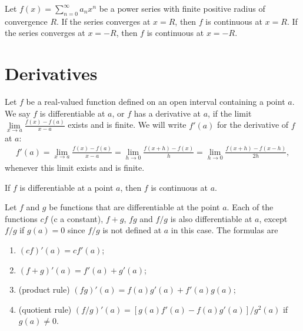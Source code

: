 \begin{theo}{1}
	Let $f(x) = \sum_{n=0}^{\infty} a_n x^n$ be a power series with finite positive radius of convergence $R$. If the series converges at $x = R$, then $f$ is continuous at $x = R$. If the series converges at $x = −R$, then $f$ is continuous	at $x = −R$.
\end{theo}

\newpage

\section{Derivatives}

\begin{defn}{1}
	Let $f$ be a real-valued function defined on an open interval containing a point $a$. We say $f$ is differentiable at $a$, or $f$ has a derivative at $a$, if the limit $\lim\limits_{x\rightarrow a} \frac{f(x)-f(a)}{x-a}$ exists and is finite. We will write $f'(a)$ for the derivative of $f$ at $a$: 
	\begin{align}
		f'(a) = \lim\limits_{x\rightarrow a} \frac{f(x)-f(a)}{x-a} = \lim\limits_{h\rightarrow 0} \frac{f(x+h)-f(x)}{h} = \lim\limits_{h\rightarrow 0} \frac{f(x+h)-f(x-h)}{2h},
	\end{align}
	whenever this limit exists and is finite.
\end{defn}

\begin{theo}{1}
	If $f$ is differentiable at a point $a$, then $f$ is continuous at $a$.
\end{theo}

\begin{theo}{1}
	Let $f$ and $g$ be functions that are differentiable at the point $a$. Each of the functions $cf$ (c a constant), $f +g$, $f g$ and $f /g$ is also differentiable at $a$, except $f /g$ if $g(a) = 0$ since $f /g$ is not defined at $a$ in this case. The formulas are
	\begin{enumerate}
		\item $(cf)'(a) = cf'(a)$;
		\item $(f + g)'(a) = f'(a) + g'(a)$;
		\item (product rule) $(fg)'(a) = f(a)g'(a) + f'(a)g(a)$;
		\item (quotient rule) $(f/g)'(a) = [g(a)f'(a) − f (a)g'(a)]/g^2(a)$ if $g(a) \neq 0$.
	\end{enumerate}
\end{theo}

